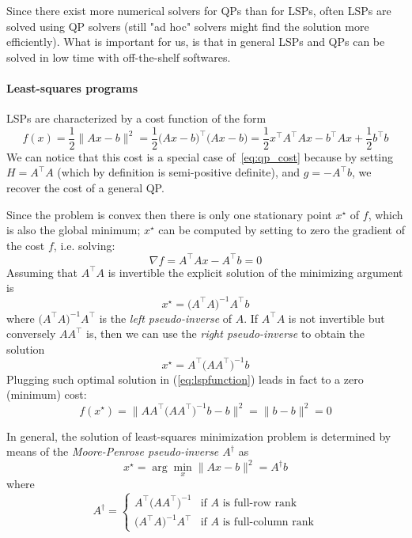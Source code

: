 	Since there exist more numerical solvers for QPs than for LSPs, often LSPs are solved using QP solvers (still "ad hoc" solvers might find the solution more efficiently). 
	What is important for us, is that in general LSPs and QPs can be solved in low time with off-the-shelf softwares.
	
	\paragraph{Least-squares programs} 
	LSPs are characterized by a cost function of the form
	\begin{equation} \label{eq:lspfunction}
		f(x) = \frac 12 \big\|Ax - b\big\|^2 = \frac 1 2 \big(Ax-b\big)^\top\big(Ax -b\big) = \frac 1 2 x^\top A^\top A x - b^\top A x + \frac 1 2 b^\top b 
	\end{equation}
	We can notice that this cost is a special case of~\eqref{eq:qp_cost} because by setting $H = A^\top A$ (which by definition is semi-positive definite), and $g = -A^\top b$, we recover the cost of a general QP.
	
	Since the problem is convex then there is only one stationary point $x^\star$ of $f$, which is also the global minimum; $x^\star$ can be computed by setting to zero the gradient of the cost $f$, i.e. solving:
	\[ \nabla f = A^\top A x - A^\top b = 0 \]
	Assuming that $A^\top A$ is invertible the explicit solution of the minimizing argument is
	\begin{equation*} \tag{$\dagger$}
		x^\star = \big(A^\top A\big)^{-1} A^\top b
	\end{equation*}
	where $\big(A^\top A\big)^{-1} A^\top$ is the \textit{left pseudo-inverse} of $A$. If $A^\top A$ is not invertible but conversely $AA^\top$ is, then we can use the \textit{right pseudo-inverse} to obtain the solution
	\begin{equation*} \tag{$\ddagger$}
		x^\star = A^\top \big(AA^\top\big)^{-1} b
	\end{equation*}
	Plugging such optimal solution in (\ref{eq:lspfunction}) leads in fact to a zero (minimum) cost:
	\[ f(x^\star) =\big\| AA^\top\big(AA^\top\big)^{-1} b - b \big\|^2 = \|b-b\|^2 = 0 \]
	
	In general, the solution of least-squares minimization problem is determined by means of the \textit{Moore-Penrose pseudo-inverse $A^\dagger$} as
	\begin{equation} \label{eq:lspsol}
		x^\star = \arg \min_x \big\| Ax - b \big\|^2 = A^\dagger b
	\end{equation}
	where
	\begin{equation}
		A^\dagger = \begin{cases}
			A^\top\big(AA^\top\big)^{-1} & \textrm{if $A$ is full-row rank} \\
			\big(A^\top A\big)^{-1}A^\top & \textrm{if $A$ is full-column rank} 
		\end{cases}
	\end{equation}
	
